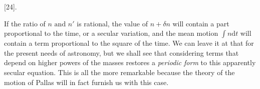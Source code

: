 \par{}\bigskip
{}
\begin{center}[24].\end{center}
\begingroup
\makeatletter
\def\@makefnmark{\hbox{\normalfont\@thefnmark}}
\makeatother
\noindent\hspace*{\parindent}If the ratio of \(n\text{ and }n'\) is rational, the value of \(n+\delta n\) will contain a part proportional to the time, or a secular variation, and the mean motion \(\int n\mathrm{d}t\) will contain a term proportional to the square of the time. We can leave it at that for the present needs of astronomy, but we shall see that considering terms that depend on higher powers of the masses restores a \textit{periodic form} to this apparently secular equation. This is all the more remarkable because the theory of the motion of Pallas will in fact furnish us with this case\HistoricalNoteEight{See pp. 557---559.] }.
\par\endgroup
